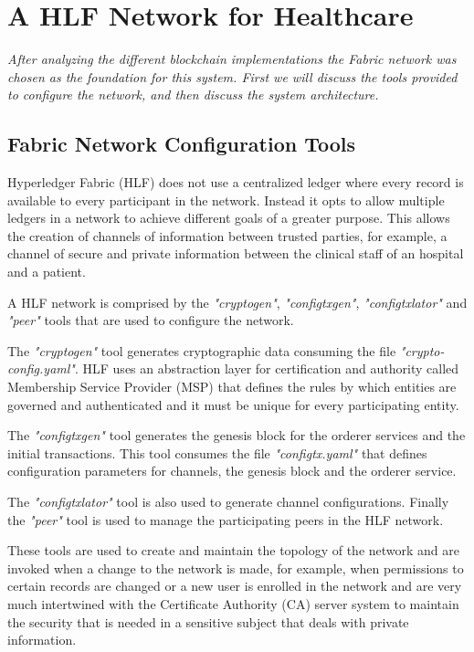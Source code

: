 \documentclass[]{llncs}
\begin{document}

\section{A HLF Network for Healthcare} \label{HLFHealthcare}
\textit{After analyzing the different blockchain implementations the Fabric network was 
chosen as the foundation for this system. 
First we will discuss the tools provided to configure the network, and then discuss 
the system architecture.}

\subsection{Fabric Network Configuration Tools}

Hyperledger Fabric (HLF) does not use a centralized ledger where every record is available to every 
participant in the network. 
Instead it opts to allow multiple ledgers in a network to achieve different goals of a greater purpose. 
This allows the creation of channels of information between trusted parties, 
for example, a channel of secure and private information between the clinical staff of an hospital and a patient.

A HLF network is comprised by the \textit{"cryptogen"}, \textit{"configtxgen"}, 
\textit{"configtxlator"} and \textit{"peer"} tools that are used to configure the network.

The \textit{"cryptogen"} tool generates cryptographic data consuming the file \textit{"crypto-config.yaml"}. 
HLF uses an abstraction layer for certification and authority called Membership Service Provider (MSP) 
that defines the rules by which entities are governed and authenticated and 
it must be unique for every participating entity.

The \textit{"configtxgen"} tool generates the genesis block for the orderer services and the initial transactions. 
This tool consumes the file \textit{"configtx.yaml"} that defines configuration parameters 
for channels, the genesis block and the orderer service.

The \textit{"configtxlator"} tool is also used to generate channel configurations. 
Finally the \textit{"peer"} tool is used to manage the participating peers in the HLF network.

These tools are used to create and maintain the topology of the network and are invoked when a change 
to the network is made, for example, when permissions to certain records are changed or a new user is
enrolled in the network and are very much intertwined with the Certificate Authority (CA) server system
to maintain the security that is needed in a sensitive subject that deals with private information.
\end{document}
